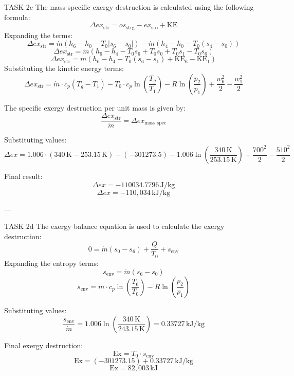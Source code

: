 TASK 2c  
The mass-specific exergy destruction is calculated using the following formula:  
\[
\Delta ex_{\text{str}} = os_{\text{strg}} - ex_{\text{sro}} + \text{KE}
\]  
Expanding the terms:  
\[
\Delta ex_{\text{str}} = \dot{m} \left( h_6 - h_0 - T_0 \left| s_6 - s_0 \right| \right) - \dot{m} \left( h_4 - h_0 - T_0 \left( s_4 - s_0 \right) \right)
\]  
\[
\Delta ex_{\text{str}} = \dot{m} \left( h_6 - h_4 - T_0 s_6 + T_0 s_0 + T_0 s_1 - T_0 s_6 \right)
\]  
\[
\Delta ex_{\text{str}} = \dot{m} \left( h_6 - h_4 - T_0 \left( s_6 - s_1 \right) + \text{KE}_6 - \text{KE}_1 \right)
\]  
Substituting the kinetic energy terms:  
\[
\Delta ex_{\text{str}} = \dot{m} \cdot c_p \left( T_g - T_1 \right) - T_0 \cdot c_p \ln \left( \frac{T_g}{T_1} \right) - R \ln \left( \frac{p_2}{p_1} \right) + \frac{w_6^2}{2} - \frac{w_1^2}{2}
\]  

The specific exergy destruction per unit mass is given by:  
\[
\frac{\Delta ex_{\text{str}}}{\dot{m}} = \Delta ex_{\text{mass spec}}
\]  

Substituting values:  
\[
\Delta ex = 1.006 \cdot \left( 340 \, \text{K} - 253.15 \, \text{K} \right) - \left( -301273.5 \right) - 1.006 \ln \left( \frac{340 \, \text{K}}{253.15 \, \text{K}} \right) + \frac{700^2}{2} - \frac{510^2}{2}
\]  

Final result:  
\[
\Delta ex = -110034.7796 \, \text{J/kg}
\]  
\[
\Delta ex = -110,034 \, \text{kJ/kg}
\]  

---

TASK 2d  
The exergy balance equation is used to calculate the exergy destruction:  
\[
0 = \dot{m} \left( s_0 - s_6 \right) + \frac{Q}{T_0} + s_{\text{env}}
\]  
Expanding the entropy terms:  
\[
s_{\text{env}} = \dot{m} \left( s_6 - s_0 \right)
\]  
\[
s_{\text{env}} = \dot{m} \cdot c_p \ln \left( \frac{T_6}{T_0} \right) - R \ln \left( \frac{p_2}{p_1} \right)
\]  

Substituting values:  
\[
\frac{s_{\text{env}}}{\dot{m}} = 1.006 \ln \left( \frac{340 \, \text{K}}{243.15 \, \text{K}} \right) = 0.33727 \, \text{kJ/kg}
\]  

Final exergy destruction:  
\[
\text{Ex} = T_0 \cdot s_{\text{env}}
\]  
\[
\text{Ex} = \left( -301273.15 \right) + 0.33727 \, \text{kJ/kg}
\]  
\[
\text{Ex} = 82,003 \, \text{kJ}
\]